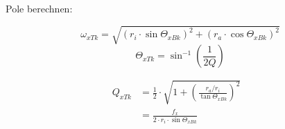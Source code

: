 \documentclass[a4paper, 12pt]{report}
\begin{document}
   	\vspace{0.3cm}
   	Pole berechnen:
   	
	\begin{minipage}[t]{0.6\textwidth}
		\[ \omega_{xTk} = \sqrt{\left(r_i \cdot \sin{\varTheta_{xBk}}\right)^2 + \left(r_a \cdot \cos{\varTheta_{xBk}}\right)^2} \]
		\[ \varTheta_{xTk} = \sin^{-1}{\left(\frac{1}{2Q}\right)} \]
	\end{minipage}
   	\begin{minipage}[t]{0.4\textwidth}
   		\vspace{-0.3cm}
   		\begin{align*}
   			Q_{xTk} &= \frac{1}{2} \cdot \sqrt{1+ \left(\frac{r_a / r_i}{\tan{\varTheta_{xBk}}}\right)^2} &\\
   			&= \frac{f_x}{2 \cdot r_i \cdot \sin{\varTheta_{xBk}}} &
   		\end{align*}

   	\end{minipage}
   	
   	 	
\clearpage

   	
\end{document}
